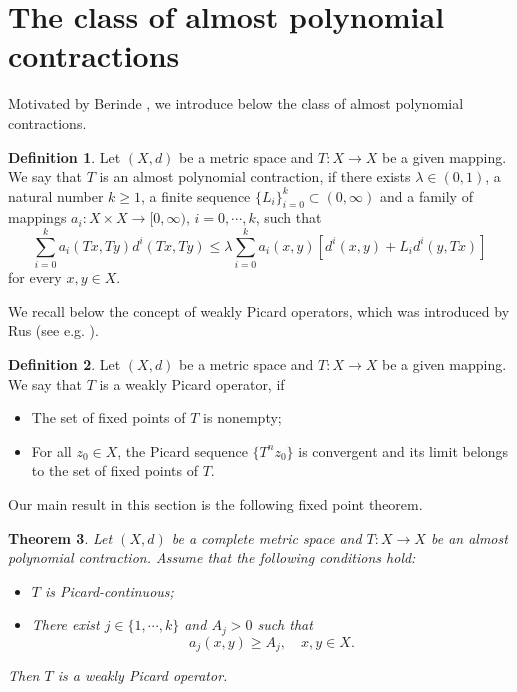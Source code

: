 \documentclass[letterpaper,12pt]{article}
\numberwithin{equation}{section}
\newtheorem{theorem}{Theorem}[section]
\theoremstyle{definition}
\newtheorem{definition}[theorem]{Definition}
\theoremstyle{remark}
\begin{document}
\section{The class of almost polynomial contractions}\label{sec3}

Motivated by Berinde \cite{Berinde1},  we introduce below the class of almost polynomial contractions. 

\begin{definition}\label{def3.1}
Let $(X,d)$ be a metric space and $T: X\to X$	 be a given mapping. We say that $T$ is an almost polynomial contraction,  if there exists $\lambda\in (0,1)$, a natural number $k\geq 1$, a finite sequence $\{L_i\}_{i=0}^k\subset (0,\infty)$  and a family of mappings  $a_i: X\times X\to [0,\infty)$, $i=0,\cdots,k$, such that 
\begin{equation}\label{SPC-B}
\sum_{i=0}^ka_i(Tx,Ty)d^i(Tx,Ty)\leq \lambda \sum_{i=0}^k a_i(x,y)\left[d^i(x,y)+L_id^i(y,Tx)\right]	
\end{equation}
for every $x,y\in X$.  
\end{definition}

We recall below the concept of weakly Picard operators, which was introduced by Rus (see e.g. \cite{Rus1,Rus2,Rus3}).

\begin{definition}
Let $(X,d)$ be a metric space and $T: X\to X$	 be a given mapping. We say that $T$ is a weakly Picard operator, if 
\begin{itemize}
\item[(i)] The set of fixed points of $T$ is nonempty;
\item[(ii)] For all $z_0\in X$, the Picard sequence $\{T^nz_0\}$ is convergent and its limit belongs to the set of fixed points of $T$. 
\end{itemize}
\end{definition}

Our main result in this section is the following fixed point theorem.

\begin{theorem}\label{T3.3}
Let $(X,d)$ be a complete metric space and $T: X\to X$ be an almost polynomial contraction. Assume that the following conditions hold:
\begin{itemize}
\item[{\rm{(i)}}]$T$ is Picard-continuous;
\item[{\rm{(ii)}}] There exist $j\in\{1,\cdots,k\}$ and 	$A_j>0$ such that 
$$
a_j(x,y)\geq A_j,\quad x,y\in X.
$$
\end{itemize}
Then $T$ is a weakly Picard operator. 
\end{theorem}
\end{document}
